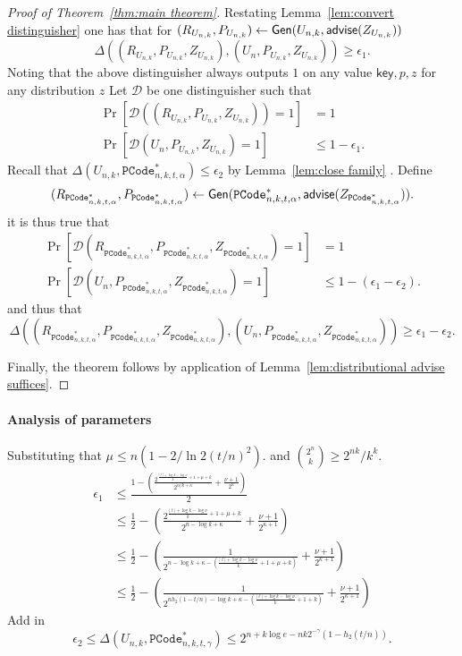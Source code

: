 \begin{proof}[Proof of Theorem~\ref{thm:main theorem}]
Restating Lemma~\ref{lem:convert distinguisher} one has that for $(R_{U_{n,k}},P_{U_{n,k}}) \leftarrow {\ensuremath{\mathsf{Gen}}}(U_{n,k}, {\mathsf{advise}}(Z_{U_{n,k}}))$
\[
\Delta((R_{U_{n,k}}, P_{U_{n,k}}, Z_{U_{n,k}}), (U_n, P_{U_{n,k}}, Z_{U_{n,k}}))\ge \epsilon_1.
\]
Noting that the above distinguisher always outputs $1$ on any value $\mathsf{key}, p, z$ for any distribution $z$ 
Let $\mathcal{D}$ be one distinguisher such that 
\begin{align*}
\Pr[\mathcal{D}((R_{U_{n,k}}, P_{U_{n,k}}, Z_{U_{n,k}}))=1] &=1\\
\Pr[\mathcal{D}(U_n, P_{U_{n,k}}, Z_{U_{n,k}})=1]&\le 1-\epsilon_1.
\end{align*}
Recall that $\Delta(U_{n,k}, \mathtt{PCode}_{n, k, t, \alpha}^{*}) \le \epsilon_2$ by Lemma~\ref{lem:close family} .  Define \[(R_{\mathtt{PCode}_{n, k, t, \alpha}^{*}}, P_{\mathtt{PCode}_{n, k, t, \alpha}^{*}})\leftarrow {\ensuremath{\mathsf{Gen}}}(\mathtt{PCode}_{n, k, t, \alpha}^{*}, {\mathsf{advise}}(Z_{\mathtt{PCode}_{n, k, t, \alpha}^{*}})).\]
it is thus true that 
\begin{align*}
\Pr[\mathcal{D}(R_{\mathtt{PCode}_{n, k, t, \alpha}^{*}}, P_{\mathtt{PCode}_{n, k, t, \alpha}^{*}}, Z_{\mathtt{PCode}_{n, k, t, \alpha}^{*}})=1]&=1\\
\Pr[\mathcal{D}(U_n, P_{\mathtt{PCode}_{n, k, t, \alpha}^{*}}, Z_{\mathtt{PCode}_{n, k, t, \alpha}^{*}})=1]&\le 1-(\epsilon_1-\epsilon_2).
\end{align*}
and thus that 
\[
\Delta((R_{\mathtt{PCode}_{n, k, t, \alpha}^{*}}, P_{\mathtt{PCode}_{n, k, t, \alpha}^{*}}, Z_{\mathtt{PCode}_{n, k, t, \alpha}^{*}}), (U_n, P_{\mathtt{PCode}_{n, k, t, \alpha}^{*}}, Z_{\mathtt{PCode}_{n, k, t, \alpha}^{*}}))\ge \epsilon_1-\epsilon_2.
\]

\noindent
Finally, the theorem follows by application of Lemma~\ref{lem:distributional advise suffices}.
\end{proof} 

\paragraph{Analysis of parameters}
Substituting that $\mu\le n(1-2/\ln 2 (t/n)^2).$ and ${2^n\choose k} \ge 2^{nk} /k^k$.
\begin{align*}
\epsilon_1 &\le \frac{1-\left(\frac{2^{\frac{|\ell|+\log{k}-\log{\nu}}{k}+1+\mu+k}}{{2^{\alpha/k+\kappa}}}+\frac{\nu+1}{2^\kappa}\right)}{2}\\
 &\le \frac{1}{2}-\left(\frac{2^{\frac{|\ell|+\log{k}-\log{\nu}}{k}+1+\mu+k}}{{2^{n-\log k+\kappa}}}+\frac{\nu+1}{2^{\kappa+1}}\right)\\
  &\le \frac{1}{2}-\left(\frac{1}{{2^{n-\log k+\kappa-(\frac{|\ell|+\log{k}-\log{\nu}}{k}+1+\mu+k)}}}+\frac{\nu+1}{2^{\kappa+1}}\right)\\
    &\le \frac{1}{2}-\left(\frac{1}{{2^{nh_2(1-t/n)-\log k+\kappa-(\frac{|\ell|+\log{k}-\log{\nu}}{k}+1+k)}}}+\frac{\nu+1}{2^{\kappa+1}}\right)
 \end{align*}
   Add in \[\epsilon_2\le \Delta(U_{n,k}, \mathtt{PCode}_{n, k, t, \gamma}^{*}) \le 2^{n+k\log e- nk2^{-\gamma}(1-h_2(t/n))}.\]


